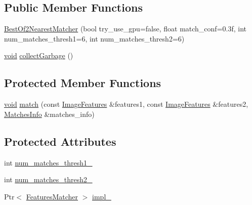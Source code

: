\subsection*{Public Member Functions}
\begin{DoxyCompactItemize}
\item 
\hyperlink{classcv_1_1detail_1_1BestOf2NearestMatcher_a442057203008c200e381b7baf2697c80}{Best\-Of2\-Nearest\-Matcher} (bool try\-\_\-use\-\_\-gpu=false, float match\-\_\-conf=0.\-3f, int num\-\_\-matches\-\_\-thresh1=6, int num\-\_\-matches\-\_\-thresh2=6)
\item 
\hyperlink{legacy_8hpp_a8bb47f092d473522721002c86c13b94e}{void} \hyperlink{classcv_1_1detail_1_1BestOf2NearestMatcher_a333bdd073ad0ea67b67230408813f365}{collect\-Garbage} ()
\end{DoxyCompactItemize}
\subsection*{Protected Member Functions}
\begin{DoxyCompactItemize}
\item 
\hyperlink{legacy_8hpp_a8bb47f092d473522721002c86c13b94e}{void} \hyperlink{classcv_1_1detail_1_1BestOf2NearestMatcher_a427ee6f0c9a75766b535e721d3e395df}{match} (const \hyperlink{structcv_1_1detail_1_1ImageFeatures}{Image\-Features} \&features1, const \hyperlink{structcv_1_1detail_1_1ImageFeatures}{Image\-Features} \&features2, \hyperlink{structcv_1_1detail_1_1MatchesInfo}{Matches\-Info} \&matches\-\_\-info)
\end{DoxyCompactItemize}
\subsection*{Protected Attributes}
\begin{DoxyCompactItemize}
\item 
int \hyperlink{classcv_1_1detail_1_1BestOf2NearestMatcher_a9feea2b5ac622dcacf9eba2f5a27dafd}{num\-\_\-matches\-\_\-thresh1\-\_\-}
\item 
int \hyperlink{classcv_1_1detail_1_1BestOf2NearestMatcher_ad1395b7d534b402b215519b6e9ac8bd9}{num\-\_\-matches\-\_\-thresh2\-\_\-}
\item 
Ptr$<$ \hyperlink{classcv_1_1detail_1_1FeaturesMatcher}{Features\-Matcher} $>$ \hyperlink{classcv_1_1detail_1_1BestOf2NearestMatcher_a9e6b74e94d69e18705e961fe753c45c4}{impl\-\_\-}
\end{DoxyCompactItemize}


